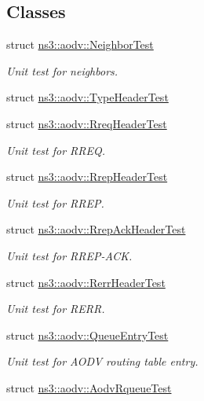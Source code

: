 \subsection*{Classes}
\begin{DoxyCompactItemize}
\item 
struct \hyperlink{structns3_1_1aodv_1_1NeighborTest}{ns3\+::aodv\+::\+Neighbor\+Test}
\begin{DoxyCompactList}\small\item\em Unit test for neighbors. \end{DoxyCompactList}\item 
struct \hyperlink{structns3_1_1aodv_1_1TypeHeaderTest}{ns3\+::aodv\+::\+Type\+Header\+Test}
\item 
struct \hyperlink{structns3_1_1aodv_1_1RreqHeaderTest}{ns3\+::aodv\+::\+Rreq\+Header\+Test}
\begin{DoxyCompactList}\small\item\em Unit test for R\+R\+EQ. \end{DoxyCompactList}\item 
struct \hyperlink{structns3_1_1aodv_1_1RrepHeaderTest}{ns3\+::aodv\+::\+Rrep\+Header\+Test}
\begin{DoxyCompactList}\small\item\em Unit test for R\+R\+EP. \end{DoxyCompactList}\item 
struct \hyperlink{structns3_1_1aodv_1_1RrepAckHeaderTest}{ns3\+::aodv\+::\+Rrep\+Ack\+Header\+Test}
\begin{DoxyCompactList}\small\item\em Unit test for R\+R\+E\+P-\/\+A\+CK. \end{DoxyCompactList}\item 
struct \hyperlink{structns3_1_1aodv_1_1RerrHeaderTest}{ns3\+::aodv\+::\+Rerr\+Header\+Test}
\begin{DoxyCompactList}\small\item\em Unit test for R\+E\+RR. \end{DoxyCompactList}\item 
struct \hyperlink{structns3_1_1aodv_1_1QueueEntryTest}{ns3\+::aodv\+::\+Queue\+Entry\+Test}
\begin{DoxyCompactList}\small\item\em Unit test for A\+O\+DV routing table entry. \end{DoxyCompactList}\item 
struct \hyperlink{structns3_1_1aodv_1_1AodvRqueueTest}{ns3\+::aodv\+::\+Aodv\+Rqueue\+Test}

\end{DoxyCompactItemize}
